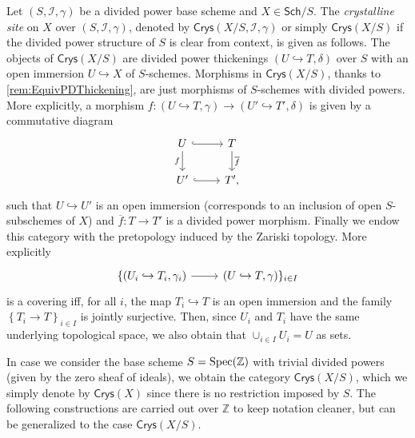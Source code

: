 \begin{defn}
	Let $\left(S, \mathcal{I}, \gamma\right)$ be a divided power base scheme
	and $X \in \mathsf{Sch}/S$.
	The \emph{crystalline site} on $X$ over $\left(S, \mathcal{I}, \gamma\right)$,
	denoted by $\mathsf{Crys}(X/S, \mathcal{I}, \gamma)$ or simply
	$\mathsf{Crys}(X/S)$ if the divided power structure of $S$ 
	is clear from context, is given as follows.
	The objects of $\mathsf{Crys}(X/S)$ are
	divided power thickenings $\left(U \hookrightarrow T, \delta\right)$ over $S$
	with an open immersion $U \hookrightarrow X$ of $S$-schemes.
	Morphisms in $\mathsf{Crys}(X/S)$, thanks to \cref{rem:EquivPDThickening},
	are just morphisms of $S$-schemes with divided powers.
	More explicitly, a morphism $f\colon \left(U \hookrightarrow T, \gamma\right)
	\to \left(U' \hookrightarrow T', \delta\right)$ is given by a commutative
	diagram
	\begin{equation}\label{diag:MorphDivPowers}
	\begin{tikzcd}
		U \arrow[d, "f"', rightarrow] \arrow[r, "", hookrightarrow] &
		T \arrow[d, "\overline{f}", rightarrow] \\
		U' \arrow[r, "", hookrightarrow] &
		T'
	,\end{tikzcd}
	\end{equation}
	such that $U \hookrightarrow U'$ is an open immersion (corresponds to
	an inclusion of open $S$-subschemes of $X$) and
	$\overline{f}\colon T \to T'$ is a divided power morphism.
	Finally we endow this category with the pretopology induced by the
	Zariski topology.
	More explicitly 
	\begin{equation*}
	\begin{tikzcd}
		\{ \left(U_i \hookrightarrow T_i, \gamma_i\right)
		\arrow[r, "", rightarrow] &
		\left(U \hookrightarrow T, \gamma\right) \}_{i \in I}
	\end{tikzcd}
	\end{equation*}
	is a covering iff, for all $i$, the map
	$T_i \hookrightarrow T$ is an open immersion and
	the family $\left\{ T_i \to T \right\}_{i \in I}$
	is jointly surjective.
	Then, since $U_i$ and $T_i$ have the same underlying topological space,
	we also obtain that $\cup_{i \in I} U_i = U$ as sets.
\end{defn}


\begin{ntt}[]
	In case we consider the base scheme $S = \operatorname{Spec}(\mathbb{Z})$
	with trivial divided powers (given by the zero sheaf of ideals),
	we obtain the category $\mathsf{Crys}(X/S)$, which
	we simply denote by $\mathsf{Crys}(X)$ since there is no
	restriction imposed by $S$.
	The following constructions are carried out over $\mathbb{Z}$ to
	keep notation cleaner, but can be generalized to the case $\mathsf{Crys}(X/S)$.
\end{ntt}


